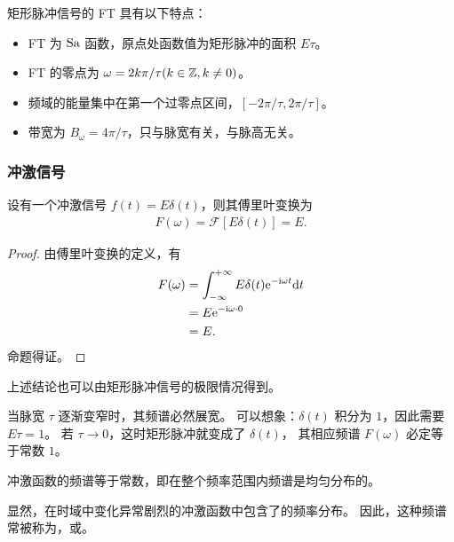 \begin{property}
    矩形脉冲信号的 FT 具有以下特点：
    \begin{itemize}
        \item FT 为 $\mathrm{Sa}$ 函数，原点处函数值为矩形脉冲的面积 $E\tau$。
        \item FT 的零点为 $\omega = 2k\pi / \tau(k \in \mathbb{Z}, k \neq 0)$。
        \item 频域的能量集中在第一个过零点区间，$[-2\pi/\tau, 2\pi/\tau]$。
        \item 带宽为 $B_\omega = 4\pi / \tau$，只与脉宽有关，与脉高无关。
    \end{itemize}
\end{property}

\subsubsection{冲激信号}

\begin{theorem}
    设有一个冲激信号 $f(t) = E\delta(t)$，则其傅里叶变换为
    \begin{align*}
        F(\omega) = \mathcal{F}[E\delta(t)] = E.
    \end{align*}
\end{theorem}

\begin{proof}
    由傅里叶变换的定义，有
    \begin{align*}
        F(\omega) & = \int_{-\infty}^{+\infty}E\delta(t)\mathrm{e}^{-\mathrm{i}\omega t}\mathrm{d}t \\
        & = E\mathrm{e}^{-\mathrm{i}\omega\cdot 0} \\
        & = E.
    \end{align*}
    命题得证。
\end{proof}

\begin{remark}
    上述结论也可以由矩形脉冲信号的极限情况得到。

    当脉宽 $\tau$ 逐渐变窄时，其频谱必然展宽。
    可以想象：$\delta(t)$ 积分为 $1$，因此需要 $E\tau = 1$。
    若 $\tau \to 0$，这时矩形脉冲就变成了 $\delta(t)$，
    其相应频谱 $F(\omega)$ 必定等于常数 $1$。
\end{remark}

\begin{definition}[均匀谱]
    冲激函数的频谱等于常数，即在整个频率范围内频谱是均匀分布的。
    
    显然，在时域中变化异常剧烈的冲激函数中包含了的频率分布。
    因此，这种频谱常被称为，或。
\end{definition}

